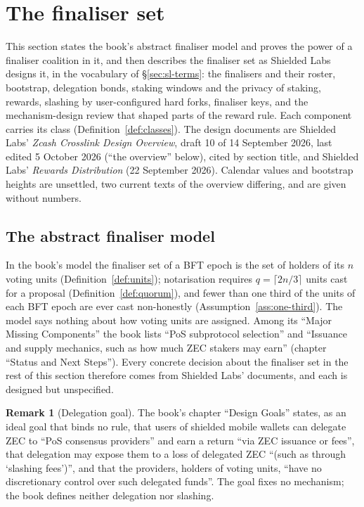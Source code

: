 \documentclass[11pt,a4paper]{article}
\theoremstyle{definition}
\newtheorem{remark}[theorem]{Remark}
\begin{document}
\section{The finaliser set}\label{sec:fs}

This section states the book's abstract finaliser model and proves the power
of a finaliser coalition in it, and then describes the finaliser set as
Shielded Labs designs it, in the vocabulary of \S\ref{sec:sl-terms}: the
finalisers and their roster, bootstrap, delegation bonds, staking windows and
the privacy of staking, rewards, slashing by user-configured hard forks,
finaliser keys, and the mechanism-design review that shaped parts of the
reward rule. Each component carries its class (Definition~\ref{def:classes}).
The design documents are Shielded Labs' \emph{Zcash Crosslink Design Overview},
draft 10 of 14 September 2026, last edited 5 October 2026 (``the overview''
below), cited by section title, and Shielded Labs' \emph{Rewards Distribution}
(22 September 2026). Calendar values and bootstrap heights are unsettled, two
current texts of the overview differing, and are given without numbers.

\subsection{The abstract finaliser model}\label{sec:fs-abstract}

In the book's model the finaliser set of a BFT epoch is the set of holders
of its $n$ voting units (Definition~\ref{def:units}); notarisation requires
$q = \lceil 2n/3 \rceil$ units cast for a proposal
(Definition~\ref{def:quorum}), and fewer than one third of the units of each
BFT epoch are ever cast non-honestly (Assumption~\ref{ass:one-third}). The
model says nothing about how voting units are assigned. Among its ``Major
Missing Components'' the book lists ``PoS subprotocol selection'' and
``Issuance and supply mechanics, such as how much ZEC stakers may earn''
(chapter ``Status and Next Steps''). Every concrete decision about the
finaliser set in the rest of this section therefore comes from Shielded
Labs' documents, and each is designed but unspecified.

\begin{remark}[Delegation goal]\label{rem:delegation-goal}
The book's chapter ``Design Goals'' states, as an ideal goal that binds no
rule, that users of shielded mobile wallets can delegate ZEC to ``PoS
consensus providers'' and earn a return ``via ZEC issuance or fees'', that
delegation may expose them to a loss of delegated ZEC ``(such as through
`slashing fees')'', and that the providers, holders of voting units, ``have
no discretionary control over such delegated funds''. The goal fixes no
mechanism; the book defines neither delegation nor slashing.
\end{remark}
\end{document}
